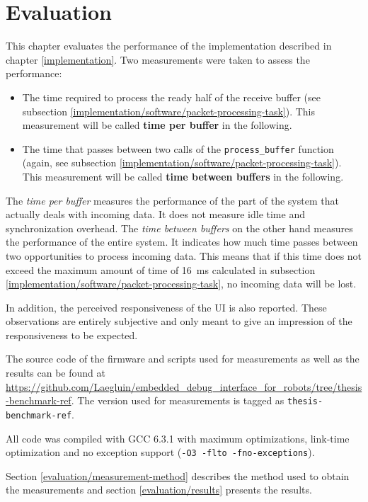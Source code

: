 \chapter{Evaluation}
\label{evaluation}

This chapter evaluates the performance of the implementation described in chapter \ref{implementation}.
Two measurements were taken to assess the performance:

\begin{itemize}
    \item The time required to process the ready half of the receive buffer (see subsection
          \ref{implementation/software/packet-processing-task}). This measurement will be called
          \textbf{time per buffer} in the following.
    \item The time that passes between two calls of the \lstinline{process_buffer} function (again, see
          subsection \ref{implementation/software/packet-processing-task}). This measurement will be
          called \textbf{time between buffers} in the following.
\end{itemize}

The \textit{time per buffer} measures the performance of the part of the system that actually deals
with incoming data. It does not measure idle time and synchronization overhead. The
\textit{time between buffers} on the other hand measures the performance of the entire system. It
indicates how much time passes between two opportunities to process incoming data. This means that
if this time does not exceed the maximum amount of time of \SI{16}{\milli\second} calculated in
subsection \ref{implementation/software/packet-processing-task}, no incoming data will be lost.

In addition, the perceived responsiveness of the UI is also reported. These observations are entirely
subjective and only meant to give an impression of the responsiveness to be expected.

The source code of the firmware and scripts used for measurements as well as the results can be found
at \url{https://github.com/Laegluin/embedded_debug_interface_for_robots/tree/thesis-benchmark-ref}.
The version used for measurements is tagged as \lstinline{thesis-benchmark-ref}.

All code was compiled with GCC 6.3.1 with maximum optimizations, link-time optimization and no
exception support (\lstinline{-O3 -flto -fno-exceptions}).

Section \ref{evaluation/measurement-method} describes the method used to obtain the measurements and
section \ref{evaluation/results} presents the results.

